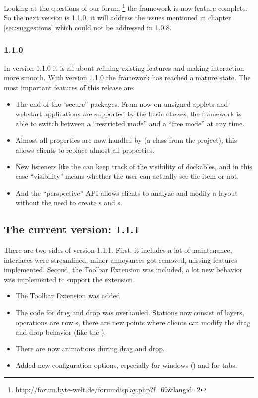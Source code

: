 Looking at the questions of our forum \footnote{\url{http://forum.byte-welt.de/forumdisplay.php?f=69&langid=2}} the framework is now feature complete. So the next version is 1.1.0, it will address the issues mentioned in chapter \ref{sec:suggestions} which could not be addressed in 1.0.8.

\subsubsection{1.1.0}
In version 1.1.0 it is all about refining existing features and making interaction more smooth. With version 1.1.0 the framework has reached a mature state. The most important features of this release are:
\begin{itemize}
 \item The end of the ``secure'' packages. From now on unsigned applets and webstart applications are supported by the basic classes, the framework is able to switch between a ``restricted mode'' and a ``free mode'' at any time.
 \item Almost all properties are now handled by  (a class from the  project), this allows clients to replace almost all properties.
 \item New listeners like the  can keep track of the visibility of dockables, and in this case ``visibility'' means whether the user can actually see the item or not.
 \item And the ``perspective'' API allows clients to analyze and modify a layout without the need to create s and s.
\end{itemize}

\subsection{The current version: 1.1.1}
There are two sides of version 1.1.1. First, it includes a lot of maintenance, interfaces were streamlined, minor annoyances got removed, missing features implemented. Second, the Toolbar Extension was included, a lot new behavior was implemented to support the extension.
\begin{itemize}
 \item The Toolbar Extension was added
 \item The code for drag and drop was overhauled. Stations now consist of layers, operations are now s, there are new points where clients can modify the drag and drop behavior (like the ).
 \item There are now animations during drag and drop.
 \item Added new configuration options, especially for windows () and for tabs.
\end{itemize}
